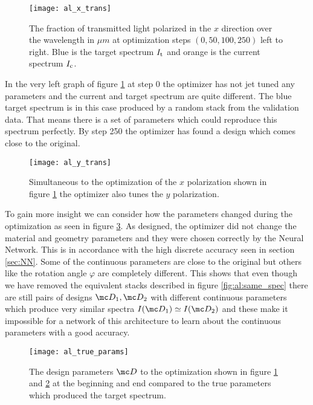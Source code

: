 \begin{figure}[H]
    \centering
    \texttt{[image: al\_x\_trans]}
    \caption{The fraction of transmitted light polarized in the $x$ direction over the wavelength in $\mu m$ at optimization steps 
    $(0, 50, 100, 250)$ left to right. Blue is the target spectrum $I_{\mathrm{t}}$ and orange is the current spectrum $I_{\mathrm{c}}$. }
    \label{fig:al:x_trans}
\end{figure}

In the very left graph of figure \ref{fig:al:x_trans} at step 0 the 
optimizer has not jet tuned any parameters and the current and target spectrum are quite different. The blue target spectrum is in this case produced by a random stack from the validation data. That means there is a set of parameters which could reproduce this spectrum perfectly. By step 250 the optimizer has found a design which comes close to the original.

\begin{figure}[H]
    \centering
    \texttt{[image: al\_y\_trans]}
    \caption{Simultaneous to the optimization of the $x$ polarization shown in figure \ref{fig:al:x_trans} the optimizer also tunes the $y$ polarization.}
    \label{fig:al:y_trans}
\end{figure}

To gain more insight we can consider how the parameters changed during the optimization as seen in figure \ref{fig:al:true_params}. As designed, the optimizer did not change the material and geometry parameters and they were chosen correctly by the Neural Network. This is in accordance with the high discrete accuracy seen in section \ref{sec:NN}. Some of the continuous parameters are close to the original but others like the rotation angle $\varphi$ are completely different. This shows that even though we have removed the equivalent stacks described in figure \ref{fig:al:same_spec} there are still pairs of designs $\mc D_1, \mc D_2$ with different continuous parameters which produce very similar spectra $I \qty(\mc D_1) \simeq I \qty(\mc D_2)$ and these make it impossible for a network of this architecture to learn about the continuous parameters with a good accuracy.

\begin{figure}[H]
    \centering
    \texttt{[image: al\_true\_params]}
    \caption{The design parameters $\mc D$ to the optimization shown in figure \ref{fig:al:x_trans} and \ref{fig:al:y_trans} at the beginning and end compared to the true parameters which produced the target spectrum.}
    \label{fig:al:true_params}
\end{figure} 